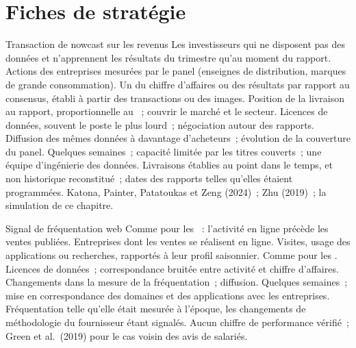 \section{Fiches de stratégie}

\begin{strategyfile}{Transaction de nowcast sur les revenus}\label{strat:s1:alternative-data-strategies:nowcast}
 Les investisseurs qui ne disposent pas des données et n'apprennent les résultats du trimestre qu'au moment du rapport.
 Actions des entreprises mesurées par le panel (enseignes de distribution, marques de grande consommation).
 Un  du chiffre d'affaires ou des résultats par rapport au consensus, établi à partir des transactions ou des images.
 Position de la livraison au rapport, proportionnelle au ~; couvrir le marché et le secteur.
 Licences de données, souvent le poste le plus lourd~; négociation autour des rapports.
 Diffusion des mêmes données à davantage d'acheteurs~; évolution de la couverture du panel.
 Quelques semaines~; capacité limitée par les titres couverts~; une équipe d'ingénierie des données.
 Livraisons établies au point dans le temps, et non historique reconstitué~; dates des rapports telles qu'elles étaient programmées.
 Katona, Painter, Patatoukas et Zeng (2024)~; Zhu (2019)~; la simulation de ce chapitre.
\end{strategyfile}

\begin{strategyfile}{Signal de fréquentation web}\label{strat:s1:alternative-data-strategies:web}
 Comme pour les ~: l'activité en ligne précède les ventes publiées.
 Entreprises dont les ventes se réalisent en ligne.
 Visites, usage des applications ou recherches, rapportés à leur profil saisonnier.
 Comme pour les .
 Licences de données~; correspondance bruitée entre activité et chiffre d'affaires.
 Changements dans la mesure de la fréquentation~; diffusion.
 Quelques semaines~; mise en correspondance des domaines et des applications avec les entreprises.
 Fréquentation telle qu'elle était mesurée à l'époque, les changements de méthodologie du fournisseur étant signalés.
 Aucun chiffre de performance vérifié~; Green et al.\ (2019) pour le cas voisin des avis de salariés.
\end{strategyfile}

